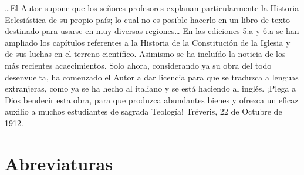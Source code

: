 \raggedbottom{} \documentclass[12pt, a4paper]{book}
\begin{document}
\ldots El Autor supone que los señores profesores explanan particularmente la Historia Eclesiástica de su propio país; lo cual no es posible hacerlo en un libro de texto destinado para usarse en muy diversas regiones\ldots
En las ediciones 5.a y 6.a se han ampliado los capítulos referentes a la Historia de la Constitución de la Iglesia y de sus luchas en el terreno científico. Asimismo se ha incluído la noticia de los más recientes acaecimientos.
Solo ahora, considerando ya su obra del todo desenvuelta, ha comenzado el Autor a dar licencia para que se traduzca a lenguas extranjeras, como ya se ha hecho al italiano y se está haciendo al inglés. ¡Plega a Dios bendecir esta obra, para que produzca abundantes bienes y ofrezca un eficaz auxilio a muchos estudiantes de sagrada Teología!
Tréveris, 22 de Octubre de 1912.
\section{Abreviaturas}
\end{document}
